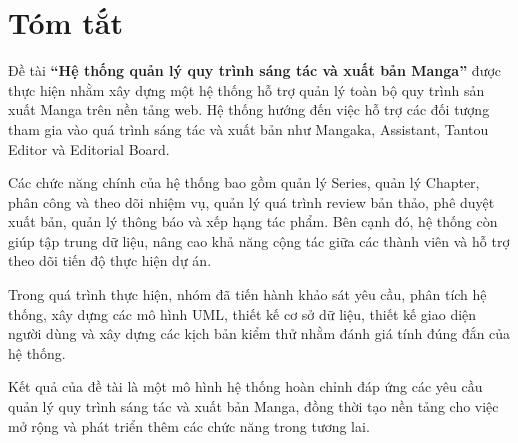 
\chapter*{Tóm tắt}

Đề tài \textbf{``Hệ thống quản lý quy trình sáng tác và xuất bản Manga''} được thực hiện nhằm xây dựng một hệ thống hỗ trợ quản lý toàn bộ quy trình sản xuất Manga trên nền tảng web. Hệ thống hướng đến việc hỗ trợ các đối tượng tham gia vào quá trình sáng tác và xuất bản như Mangaka, Assistant, Tantou Editor và Editorial Board.

Các chức năng chính của hệ thống bao gồm quản lý Series, quản lý Chapter, phân công và theo dõi nhiệm vụ, quản lý quá trình review bản thảo, phê duyệt xuất bản, quản lý thông báo và xếp hạng tác phẩm. Bên cạnh đó, hệ thống còn giúp tập trung dữ liệu, nâng cao khả năng cộng tác giữa các thành viên và hỗ trợ theo dõi tiến độ thực hiện dự án.

Trong quá trình thực hiện, nhóm đã tiến hành khảo sát yêu cầu, phân tích hệ thống, xây dựng các mô hình UML, thiết kế cơ sở dữ liệu, thiết kế giao diện người dùng và xây dựng các kịch bản kiểm thử nhằm đánh giá tính đúng đắn của hệ thống.

Kết quả của đề tài là một mô hình hệ thống hoàn chỉnh đáp ứng các yêu cầu quản lý quy trình sáng tác và xuất bản Manga, đồng thời tạo nền tảng cho việc mở rộng và phát triển thêm các chức năng trong tương lai.

